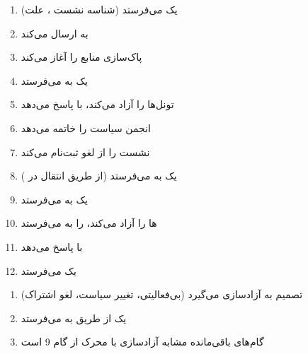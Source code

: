\begin{enumerate}
\def\labelenumi{\arabic{enumi}.}
\tightlist
\item
   یک  می‌فرستد (شناسه نشست ، علت)
\item
   به  ارسال می‌کند 
\item
   پاک‌سازی منابع را آغاز می‌کند
\item
   یک  به  می‌فرستد
\item
   تونل‌ها را آزاد می‌کند، با  پاسخ می‌دهد
\item
   انجمن سیاست  را خاتمه می‌دهد
\item
   نشست را از  لغو ثبت‌نام می‌کند
\item
   یک  به  می‌فرستد (از طریق انتقال  در )
\item
   یک  به  می‌فرستد
\item
  ها را آزاد می‌کند،  را به  می‌فرستد
\item
   با  پاسخ می‌دهد
\item
   یک  می‌فرستد
\end{enumerate}


\begin{enumerate}
\def\labelenumi{\arabic{enumi}.}
\tightlist
\item
   تصمیم به آزادسازی می‌گیرد (بی‌فعالیتی، تغییر سیاست، لغو اشتراک)
\item
   یک  از طریق  به  می‌فرستد
\item
  گام‌های باقی‌مانده مشابه آزادسازی با محرک  از گام 9 است
\end{enumerate}



